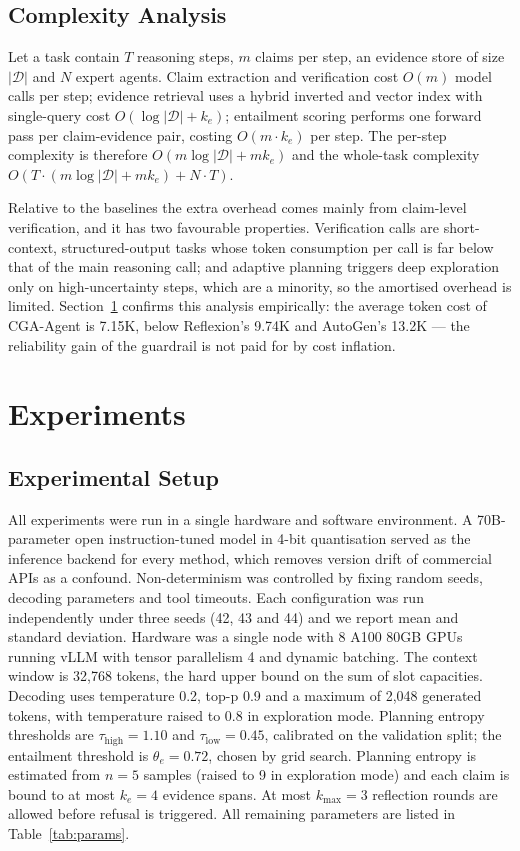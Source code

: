\documentclass[journal,10pt,a4paper]{IEEEtran}
\begin{document}
\subsection{Complexity Analysis}
Let a task contain $T$ reasoning steps, $m$ claims per step, an evidence store of size $\lvert\mathcal{D}\rvert$ and $N$ expert agents. Claim extraction and verification cost $O(m)$ model calls per step; evidence retrieval uses a hybrid inverted and vector index with single-query cost $O(\log\lvert\mathcal{D}\rvert+k_e)$; entailment scoring performs one forward pass per claim-evidence pair, costing $O(m\cdot k_e)$ per step. The per-step complexity is therefore $O(m\log\lvert\mathcal{D}\rvert+mk_e)$ and the whole-task complexity $O\!\left(T\cdot(m\log\lvert\mathcal{D}\rvert+mk_e)+N\cdot T\right)$.

Relative to the baselines the extra overhead comes mainly from claim-level verification, and it has two favourable properties. Verification calls are short-context, structured-output tasks whose token consumption per call is far below that of the main reasoning call; and adaptive planning triggers deep exploration only on high-uncertainty steps, which are a minority, so the amortised overhead is limited. Section~\ref{sec:experiments} confirms this analysis empirically: the average token cost of CGA-Agent is 7.15K, below Reflexion's 9.74K and AutoGen's 13.2K --- the reliability gain of the guardrail is not paid for by cost inflation.

\section{Experiments}
\label{sec:experiments}
\subsection{Experimental Setup}
All experiments were run in a single hardware and software environment. A 70B-parameter open instruction-tuned model in 4-bit quantisation served as the inference backend for every method, which removes version drift of commercial APIs as a confound. Non-determinism was controlled by fixing random seeds, decoding parameters and tool timeouts. Each configuration was run independently under three seeds (42, 43 and 44) and we report mean and standard deviation. Hardware was a single node with 8 A100 80GB GPUs running vLLM with tensor parallelism 4 and dynamic batching. The context window is 32,768 tokens, the hard upper bound on the sum of slot capacities. Decoding uses temperature 0.2, top-p 0.9 and a maximum of 2,048 generated tokens, with temperature raised to 0.8 in exploration mode. Planning entropy thresholds are $\tau_{\mathrm{high}}=1.10$ and $\tau_{\mathrm{low}}=0.45$, calibrated on the validation split; the entailment threshold is $\theta_e=0.72$, chosen by grid search. Planning entropy is estimated from $n=5$ samples (raised to 9 in exploration mode) and each claim is bound to at most $k_e=4$ evidence spans. At most $k_{\max}=3$ reflection rounds are allowed before refusal is triggered. All remaining parameters are listed in Table~\ref{tab:params}.
\end{document}

